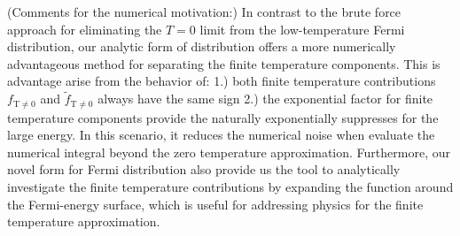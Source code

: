 \documentclass[sn-mathphys,Numbered]{sn-jnl}
\newcommand*{\xred}{\color{red}}
\begin{document}
{\xred(Comments for the numerical motivation:) In contrast to the brute force approach for eliminating the $T=0$ limit from the low-temperature Fermi distribution, our analytic form of distribution offers a more numerically advantageous method for separating the finite temperature components. This is advantage arise from the behavior of: 1.) both finite temperature contributions $f_\mathrm{T\neq0}$ and $\tilde f_\mathrm{T\neq0}$ always have the same sign 2.) the exponential factor for finite temperature components provide the naturally exponentially suppresses for the large energy. In this scenario, it reduces the numerical noise when evaluate the numerical integral beyond the zero temperature approximation. Furthermore, our novel form for Fermi distribution also provide us the tool to analytically investigate the finite temperature contributions by expanding the function around the Fermi-energy surface, which is useful for addressing physics for the finite temperature approximation.}
\end{document}
